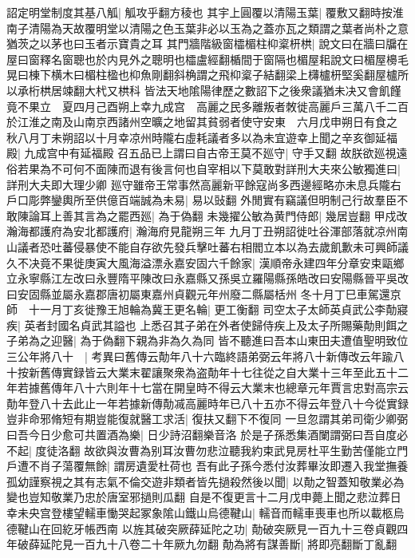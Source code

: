 詔定明堂制度其基八觚|{
	觚攻乎翻方稜也}
其宇上圓覆以清陽玉葉|{
	覆敷又翻時按淮南子清陽為天故覆明堂以清陽之色玉葉非必以玉為之蓋亦瓦之類謂之葉者尚朴之意猶茨之以茅也曰玉者示寶貴之耳}
其門牆階級窗櫺楣柱枊楶枅栱|{
	說文曰在牆曰牖在屋曰窗釋名窗聰也於内見外之聰明也櫺盧經翻楯間于窗隔也楣屋耜說文曰楣屋櫋毛晃曰棟下横木曰楣柱楹也枊魚剛翻斜桷謂之飛枊楶子結翻梁上欂櫨枅堅奚翻屋櫨所以承桁栱居竦翻大杙又栱科}
皆法天地隂陽律歷之數詔下之後衆議猶未决又會飢饉竟不果立　夏四月己酉朔上幸九成宫　高麗之民多離叛者敇徙高麗戶三萬八千二百於江淮之南及山南京西諸州空曠之地留其貧弱者使守安東　六月戊申朔日有食之　秋八月丁未朔詔以十月幸凉州時隴右虛耗議者多以為未宜遊幸上聞之辛亥御延福殿|{
	九成宫中有延福殿}
召五品已上謂曰自古帝王莫不廵守|{
	守手又翻}
故朕欲廵視遠俗若果為不可何不面陳而退有後言何也自宰相以下莫敢對詳刑大夫來公敏獨進曰|{
	詳刑大夫即大理少卿}
廵守雖帝王常事然高麗新平餘寇尚多西邊經略亦未息兵隴右戶口彫弊鑾輿所至供億百端誠為未易|{
	易以䜴翻}
外閒實有竊議但明制己行故羣臣不敢陳論耳上善其言為之罷西廵|{
	為于偽翻}
未幾擢公敏為黄門侍郎|{
	幾居豈翻}
甲戍改瀚海都護府為安北都護府|{
	瀚海府見龍朔三年}
九月丁丑朔詔徙吐谷渾部落就凉州南山議者恐吐蕃侵暴使不能自存欲先發兵擊吐蕃右相閻立本以為去歲飢歉未可興師議久不决竟不果徙庚寅大風海溢漂永嘉安固六千餘家|{
	漢順帝永建四年分章安束甌鄉立永寧縣江左改曰永豐隋平陳改曰永嘉縣又孫吳立羅陽縣孫皓改曰安陽縣晉平吳改曰安固縣並屬永嘉郡唐初屬東嘉州貞觀元年州廢二縣屬栝州}
冬十月丁巳車駕還京師　十一月丁亥徙豫王旭輪為冀王更名輪|{
	更工衡翻}
司空太子太師英貞武公李勣寢疾|{
	英者封國名貞武其謚也}
上悉召其子弟在外者使歸侍疾上及太子所賜藥勣則餌之子弟為之迎醫|{
	為于偽翻下親為非為久為同}
皆不聽進曰吾本山東田夫遭值聖明致位三公年將八十　|{
	考異曰舊傳云勣年八十六臨終語弟弼云年將八十新傳改云年踰八十按新舊傳實録皆云大業末翟讓聚衆為盗勣年十七往從之自大業十三年至此五十二年若據舊傳年八十六則年十七當在開皇時不得云大業末也總章元年賈言忠對高宗云勣年登八十去此止一年若據新傳勣㓕高麗時年已八十五亦不得云年登八十今從實録}
豈非命邪脩短有期豈能復就醫工求活|{
	復扶又翻下不復同}
一旦忽謂其弟司衛少卿弼曰吾今日少愈可共置酒為樂|{
	日少詩沼翻樂音洛}
於是子孫悉集酒闌謂弼曰吾自度必不起|{
	度徒洛翻}
故欲與汝曹為别耳汝曹勿悲泣聽我約束武見房杜平生勤苦僅能立門戶遭不肖子蕩覆無餘|{
	謂房遺愛杜荷也}
吾有此子孫今悉付汝葬畢汝即遷入我堂撫養孤幼謹察視之其有志氣不倫交遊非類者皆先撾殺然後以聞|{
	以勣之智蓋知敬業必為變也豈知敬業乃忠於唐室邪撾則瓜翻}
自是不復更言十二月戊申薨上聞之悲泣葬日幸未央宫登樓望轜車慟哭起冢象隂山鐵山烏德鞬山|{
	轜音而轜車喪車也所以載柩烏德鞬山在回紇牙帳西南}
以旌其破突厥薛延陀之功|{
	勣破突厥見一百九十三卷貞觀四年破薛延陀見一百九十八卷二十年厥九勿翻}
勣為將有謀善斷|{
	將即亮翻斷丁亂翻}
